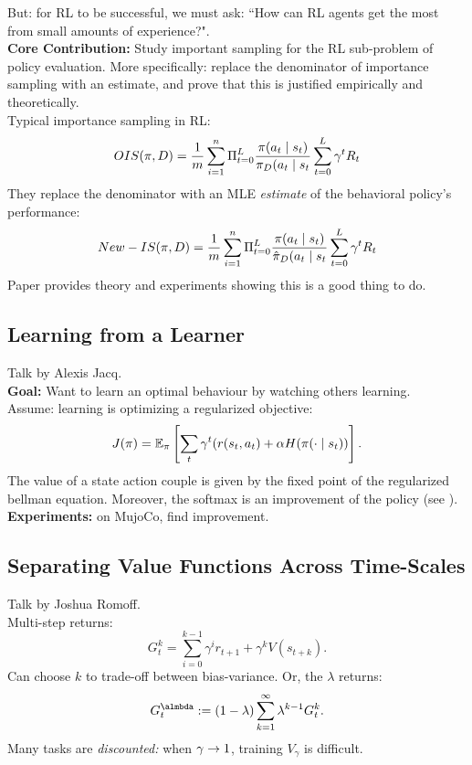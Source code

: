 But: for RL to be successful, we must ask: ``How can RL agents get the most from small amounts of experience?". \\

{\bf Core Contribution:} Study important sampling for the RL sub-problem of policy evaluation. More specifically: replace the denominator of importance sampling with an estimate, and prove that this is justified empirically and theoretically. \\

Typical importance sampling in RL:
\[
OIS(\pi, D) = \frac{1}{m} \sum_{i = 1}^n \Pi_{t=0}^L \frac{\pi(a_t \mid s_t)}{\pi_D(a_t \mid s_t} \sum_{t=0}^L \gamma^t R_t
\]
They replace the denominator with an MLE {\it estimate} of the behavioral policy's performance:
\[
New-IS(\pi, D) = \frac{1}{m} \sum_{i = 1}^n \Pi_{t=0}^L \frac{\pi(a_t \mid s_t)}{\hat{\pi}_D(a_t \mid s_t} \sum_{t=0}^L \gamma^t R_t
\]
Paper provides theory and experiments showing this is a good thing to do. 

\spacerule

\subsection{Learning from a Learner}

Talk by Alexis Jacq. \\

{\bf Goal:} Want to learn an optimal behaviour by watching others learning. \\

Assume: learning is optimizing a regularized objective:
\[
J(\pi) = \mathbb{E}_\pi \left[ \sum_{t} \gamma^t(r(s_t,a_t) + \alpha H(\pi(\cdot \mid s_t))\right].
\]
The value of a state action couple is given by the fixed point of the regularized bellman equation. Moreover, the softmax is an improvement of the policy (see \citet{haarnoja2018soft}). \\

{\bf Experiments:} on MujoCo, find improvement.

\spacerule

\subsection{Separating Value Functions Across Time-Scales}

Talk by Joshua Romoff. \\

Multi-step returns:
\[
G_t^k = \sum_{i=0}^{k-1} \gamma^i r_{t+1} + \gamma^k V(s_{t+k}).
\]
Can choose $k$ to trade-off between bias-variance. Or, the $\lambda$ returns:
\[
G_t^\almbda := (1-\lambda) \sum_{k=1}^\infty \lambda^{k-1} G_t^k.
\]
Many tasks are {\it discounted:} when $\gamma \rightarrow 1$, training $V_\gamma$ is difficult. \\

